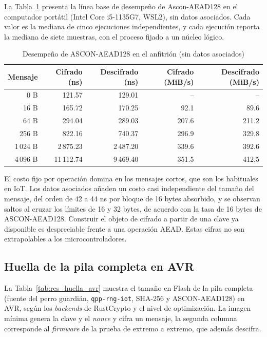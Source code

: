 La Tabla~\ref{tab:res_ascon_bench} presenta la línea base de desempeño de Ascon-AEAD128 en el computador portátil (Intel Core i5-1135G7, WSL2), sin datos asociados. Cada valor es la mediana de cinco ejecuciones independientes, y cada ejecución reporta la mediana de siete muestras, con el proceso fijado a un núcleo lógico.

\begin{table}[H]
\centering
\caption{Desempeño de ASCON-AEAD128 en el anfitrión (sin datos asociados)}
\label{tab:res_ascon_bench}
\begin{tabular}{@{}rrrrr@{}}
\toprule
\textbf{Mensaje} & \textbf{Cifrado (ns)} & \textbf{Descifrado (ns)} & \textbf{Cifrado (MiB/s)} & \textbf{Descifrado (MiB/s)} \\
\midrule
0 B & 121.57 & 129.01 & -- & -- \\
16 B & 165.72 & 170.25 & 92.1 & 89.6 \\
64 B & 294.04 & 289.03 & 207.6 & 211.2 \\
256 B & 822.16 & 740.37 & 296.9 & 329.8 \\
1\,024 B & 2\,875.23 & 2\,487.20 & 339.6 & 392.6 \\
4\,096 B & 11\,112.74 & 9\,469.40 & 351.5 & 412.5 \\
\bottomrule
\end{tabular}
\end{table}

El costo fijo por operación domina en los mensajes cortos, que son los habituales en IoT. Los datos asociados añaden un costo casi independiente del tamaño del mensaje, del orden de 42 a 44 ns por bloque de 16 bytes absorbido, y se observan saltos al cruzar los límites de 16 y 32 bytes, de acuerdo con la tasa de 16 bytes de ASCON-AEAD128. Construir el objeto de cifrado a partir de una clave ya disponible es despreciable frente a una operación AEAD. Estas cifras no son extrapolables a los microcontroladores.

\subsection{Huella de la pila completa en AVR}

La Tabla~\ref{tab:res_huella_avr} muestra el tamaño en Flash de la pila completa (fuente del perro guardián, \texttt{qpp-rng-iot}, SHA-256 y ASCON-AEAD128) en AVR, según los \textit{backends} de RustCrypto y el nivel de optimización. La imagen mínima genera la clave y el \textit{nonce} y cifra un mensaje, la segunda columna corresponde al \textit{firmware} de la prueba de extremo a extremo, que además descifra.

